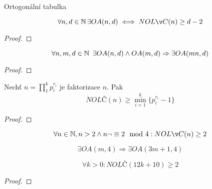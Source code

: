 \begin{definition}
	Ortogonální tabulka %
\end{definition}

\begin{theorem}
	\[ \forall n,d \in \N \exists OA(n, d) \iff NOLČ(n) \geq d - 2 \]
\end{theorem}
\begin{proof}
\end{proof}

\begin{theorem}
	\[ \forall n,m,d \in \operatorname{\mathbb{N}} \ \exists OA(n, d) \land OA(m, d) \Rightarrow \exists OA(mn, d) \]
\end{theorem}
\begin{proof}
\end{proof}

\begin{theorem}
	Nechť $n = \prod_1^k p_i^{r_i}$ je faktorizace $n$. Pak
	\[ NOLČ(n) \geq \min_{i = 1}^k \{ p_i^{r_i} - 1 \}  \]
\end{theorem}
\begin{proof}
\end{proof}

\begin{consequence}
	\[ \forall n \in \N, n > 2 \land n \neg \equiv 2 \mod 4: NOLČ(n) \geq 2 \]
\end{consequence}

\begin{lemma}
	\[ \exists OA(m, 4) \Rightarrow \exists OA(3m + 1, 4) \]
\end{lemma}

\begin{theorem}
	\[ \forall k > 0: NOLČ(12 k + 10) \geq 2 \]
\end{theorem}
\begin{proof}
\end{proof}
